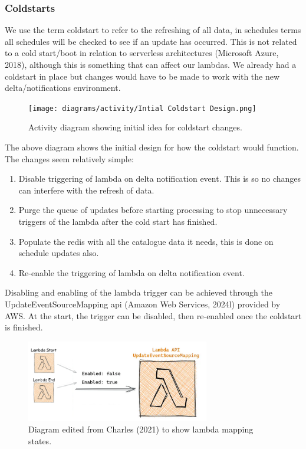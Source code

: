   \newpage
  \subsubsection{Coldstarts}
  We use the term coldstart to refer to the refreshing of all data, in schedules terms all schedules will be checked to see if an update has occurred.
  This is not related to a cold start/boot in relation to serverless architectures (Microsoft Azure, 2018), although this is something that can affect 
  our lambdas. We already had a coldstart in place but changes would have to be made to work with the new delta/notifications environment.

  \begin{figure}[H]
    \centering
    \texttt{[image: diagrams/activity/Intial Coldstart Design.png]}
    \caption{Activity diagram showing initial idea for coldstart changes.}
    \label{fig:initialColdstart}
  \end{figure}

  The above diagram shows the initial design for how the coldstart would function. The changes seem relatively simple:
  \begin{enumerate}
    \item Disable triggering of lambda on delta notification event. This is so no changes can interfere with the refresh of data.
    \item Purge the queue of updates before starting processing to stop unnecessary triggers of the lambda after the cold start has finished.
    \item Populate the redis with all the catalogue data it needs, this is done on schedule updates also. 
    \item Re-enable the triggering of lambda on delta notification event.
  \end{enumerate}

  Disabling and enabling of the lambda trigger can be achieved through the UpdateEventSourceMapping api (Amazon Web Services, 2024l) provided by AWS. 
  At the start, the trigger can be disabled, then re-enabled once the coldstart is finished.

  \begin{figure}[H]
    \centering
    \includegraphics[width=8cm]{assets/lambdaMapping.png}
    \caption{Diagram edited from Charles (2021) to show lambda mapping states.}
    \label{fig:lambdaMapping}
  \end{figure}

